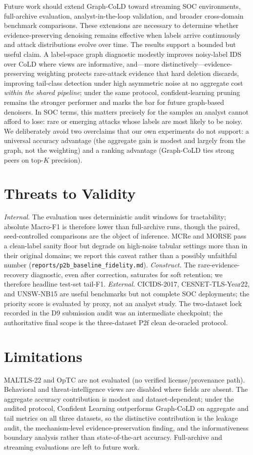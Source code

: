 \documentclass[preprint,3p,times]{elsarticle}
\begin{document}
Future work should extend Graph-CoLD toward streaming SOC environments,
full-archive evaluation, analyst-in-the-loop validation, and broader
cross-domain benchmark comparisons. These extensions are necessary to determine
whether evidence-preserving denoising remains effective when labels arrive
continuously and attack distributions evolve over time.
The results support a bounded but useful claim. A label-space graph diagnostic
modestly improves noisy-label IDS over CoLD where views are informative, and—more
distinctively—evidence-preserving weighting protects rare-attack evidence that
hard deletion discards, improving tail-class detection under high asymmetric noise
at no aggregate cost \emph{within the shared pipeline}; under the same protocol,
confident-learning pruning remains the stronger performer and marks the bar for
future graph-based denoisers. In SOC terms, this matters precisely for the samples an
analyst cannot afford to lose: rare or emerging attacks whose labels are most
likely to be noisy. We deliberately avoid two overclaims that our own experiments
do not support: a universal accuracy advantage (the aggregate gain is modest and
largely from the graph, not the weighting) and a ranking advantage (Graph-CoLD
ties strong peers on top-$K$ precision).

\section{Threats to Validity}
\label{sec:threats}
\emph{Internal.} The evaluation uses deterministic audit windows for tractability;
absolute Macro-F1 is therefore lower than full-archive runs, though the paired,
seed-controlled comparisons are the object of inference. MCRe and MORSE pass a
clean-label sanity floor but degrade on high-noise tabular settings more than in
their original domains; we report this caveat rather than a possibly unfaithful
number (\texttt{reports/p2b\_baseline\_fidelity.md}).
\emph{Construct.} The rare-evidence-recovery diagnostic, even after correction,
saturates for soft retention; we therefore headline test-set tail-F1.
\emph{External.} CICIDS-2017, CESNET-TLS-Year22, and UNSW-NB15 are useful
benchmarks but not complete SOC deployments; the priority score is evaluated by
proxy, not an analyst study. The two-dataset lock recorded in the D9 submission
audit was an intermediate checkpoint; the authoritative final scope is the
three-dataset P2f clean de-oracled protocol.

\section{Limitations}
\label{sec:limits}
MALTLS-22 and OpTC are not evaluated (no verified license/provenance path).
Behavioral and threat-intelligence views are disabled where fields are absent. The
aggregate accuracy contribution is modest and dataset-dependent; under the
audited protocol, Confident Learning outperforms Graph-CoLD on aggregate and
tail metrics on all three datasets, so the distinctive contribution is the
leakage audit, the mechanism-level evidence-preservation finding, and the
informativeness boundary analysis rather than state-of-the-art accuracy.
Full-archive and streaming
evaluations are left to future work.
\end{document}
